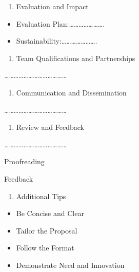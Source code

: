 \documentclass[
  letterpaper,
  DIV=11,
  numbers=noendperiod]{scrreprt}
\providecommand{\tightlist}{%
  \setlength{\itemsep}{0pt}\setlength{\parskip}{0pt}}\usepackage{longtable,booktabs,array}
\begin{document}
\begin{enumerate}
\def\labelenumi{\arabic{enumi}.}
\setcounter{enumi}{6}
\tightlist
\item
  Evaluation and Impact
\end{enumerate}

\begin{itemize}
\item
  Evaluation Plan:\ldots\ldots\ldots\ldots\ldots\ldots\ldots.
\item
  Sustainability:\ldots\ldots\ldots\ldots\ldots\ldots\ldots.
\end{itemize}

\begin{enumerate}
\def\labelenumi{\arabic{enumi}.}
\setcounter{enumi}{7}
\tightlist
\item
  Team Qualifications and Partnerships
\end{enumerate}

\ldots\ldots\ldots\ldots\ldots\ldots\ldots\ldots\ldots\ldots\ldots\ldots\ldots{}

\begin{enumerate}
\def\labelenumi{\arabic{enumi}.}
\setcounter{enumi}{8}
\tightlist
\item
  Communication and Dissemination
\end{enumerate}

\ldots\ldots\ldots\ldots\ldots\ldots\ldots\ldots\ldots\ldots\ldots\ldots\ldots{}

\begin{enumerate}
\def\labelenumi{\arabic{enumi}.}
\setcounter{enumi}{9}
\tightlist
\item
  Review and Feedback
\end{enumerate}

\ldots\ldots\ldots\ldots\ldots\ldots\ldots\ldots\ldots\ldots\ldots\ldots\ldots{}

Proofreading

Feedback

\begin{enumerate}
\def\labelenumi{\arabic{enumi}.}
\setcounter{enumi}{10}
\tightlist
\item
  Additional Tips
\end{enumerate}

\begin{itemize}
\item
  Be Concise and Clear
\item
  Tailor the Proposal
\item
  Follow the Format
\item
  Demonstrate Need and Innovation
\end{itemize}
\end{document}
